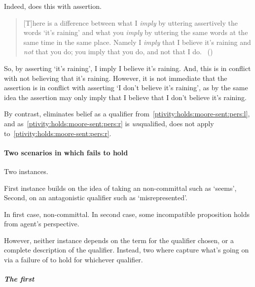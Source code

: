 \begin{note}
{    Indeed, \citeauthor{Moore:1993wk} does this with assertion.
    \begin{quote}
      [T]here is a difference between what I \emph{imply} by uttering assertively the words `it's raining' and what you \emph{imply} by uttering the same words at the same time in the same place.
      Namely I \emph{imply} that I believe it's raining and \emph{not} that you do; you imply that you do, and not that I do.%
      \mbox{ }\hfill\mbox{(\citeyear[209--210]{Moore:1993wk})}
    \end{quote}
    So, by asserting `it's raining', I imply I believe it's raining.
    And, this is in conflict with not believing that it's raining.
    However, it is not immediate that the assertion is in conflict with asserting `I don't believe it's raining', as by the same idea the assertion may only imply that I believe that I don't believe it's raining.
  }
  By contrast, \ptivity{} eliminates belief as a qualifier from~\ref{ptivity:holds:moore-sent:pers:l}, and as~\ref{ptivity:holds:moore-sent:pers:r} is \emph{un}qualified, \ptivity{} does not apply to~\ref{ptivity:holds:moore-sent:pers:r}.
\end{note}

\paragraph{Two scenarios in which \ptivity{} fails to hold}

\begin{note}
  Two instances.

  First instance builds on the idea of taking an non-committal such as `seems',
  Second, on an antagonistic qualifier such as `misrepresented'.

  In first case, non-committal.
  In second case, some incompatible proposition holds from agent's perspective.

  However, neither instance depends on the term for the qualifier chosen, or a complete description of the qualifier.
  Instead, two  where capture what's going on via a failure of \ptivity{} to hold for whichever qualifier.
\end{note}

\subparagraph{The first }

